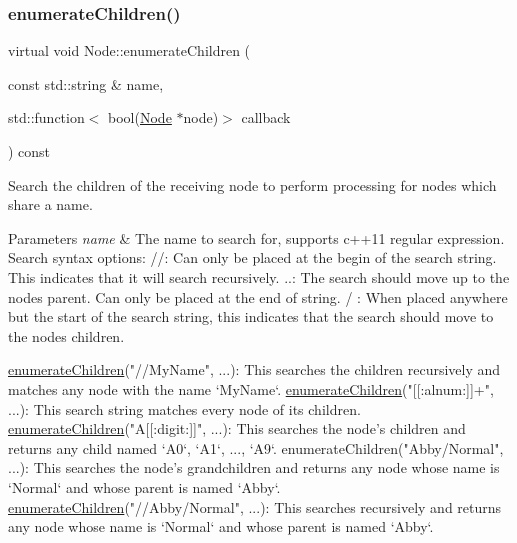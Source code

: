 \subsubsection{\texorpdfstring{enumerate\+Children()}{enumerateChildren()}\hspace{0.1cm}{\footnotesize\ttfamily [2/2]}}
{\footnotesize\ttfamily virtual void Node\+::enumerate\+Children (\begin{DoxyParamCaption}\item[{const std\+::string \&}]{name,  }\item[{std\+::function$<$ bool(\hyperlink{classNode}{Node} $\ast$node)$>$}]{callback }\end{DoxyParamCaption}) const\hspace{0.3cm}{\ttfamily [virtual]}}

Search the children of the receiving node to perform processing for nodes which share a name.


\begin{DoxyParams}{Parameters}
{\em name} & The name to search for, supports c++11 regular expression. Search syntax options\+: {\ttfamily //}\+: Can only be placed at the begin of the search string. This indicates that it will search recursively. {\ttfamily ..}\+: The search should move up to the node\textquotesingle{}s parent. Can only be placed at the end of string. {\ttfamily /} \+: When placed anywhere but the start of the search string, this indicates that the search should move to the node\textquotesingle{}s children.\\
\hline
\end{DoxyParams}

\begin{DoxyCode}
\hyperlink{classNode_ada6f69bdf4cd0b241dc12935536f3dbe}{enumerateChildren}(\textcolor{stringliteral}{"//MyName"}, ...): This searches the children recursively and matches any
       node with the name `MyName`.
\hyperlink{classNode_ada6f69bdf4cd0b241dc12935536f3dbe}{enumerateChildren}(\textcolor{stringliteral}{"[[:alnum:]]+"}, ...): This search string matches every node of its 
      children.
\hyperlink{classNode_ada6f69bdf4cd0b241dc12935536f3dbe}{enumerateChildren}(\textcolor{stringliteral}{"A[[:digit:]]"}, ...): This searches the node\textcolor{stringliteral}{'s children and returns any
       child named `A0`, `A1`, ..., `A9`.}
\textcolor{stringliteral}{enumerateChildren("Abby/Normal", ...): This searches the node'}s grandchildren and returns any node whose 
      name is `Normal`
and whose parent is named `Abby`.
\hyperlink{classNode_ada6f69bdf4cd0b241dc12935536f3dbe}{enumerateChildren}(\textcolor{stringliteral}{"//Abby/Normal"}, ...): This searches recursively and returns any node 
      whose name is `Normal` and whose
parent is named `Abby`.
\end{DoxyCode}


